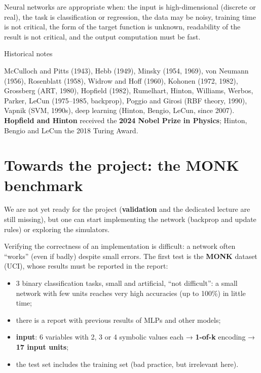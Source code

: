Neural networks are appropriate when: the input is high-dimensional
(discrete or real), the task is classification or regression, the data
may be noisy, training time is not critical, the form of the target
function is unknown, readability of the result is not critical, and the
output computation must be fast.

\begin{boxnote}{Historical notes}

McCulloch and Pitts (1943), Hebb (1949), Minsky (1954, 1969), von
Neumann (1956), Rosenblatt (1958), Widrow and Hoff (1960), Kohonen
(1972, 1982), Grossberg (ART, 1980), Hopfield (1982), Rumelhart,
Hinton, Williams, Werbos, Parker, LeCun (1975--1985, backprop), Poggio
and Girosi (RBF theory, 1990), Vapnik (SVM, 1990s), deep learning
(Hinton, Bengio, LeCun, since 2007). \textbf{Hopfield and Hinton}
received the \textbf{2024 Nobel Prize in Physics}; Hinton, Bengio and
LeCun the 2018 Turing Award.

\end{boxnote}

\section{Towards the project: the MONK
benchmark}\label{verso-il-progetto-il-benchmark-monk}

We are not yet ready for the project (\textbf{validation} and the
dedicated lecture are still missing), but one can start implementing
the network (backprop and update rules) or exploring the simulators.

Verifying the correctness of an implementation is difficult: a network
often ``works'' (even if badly) despite small errors. The first test is
the \textbf{MONK} dataset (UCI), whose results must be reported in the
report:

\begin{itemize}
\tightlist
\item
  3 binary classification tasks, small and artificial, ``not
  difficult'': a small network with few units reaches very high
  accuracies (up to 100\%) in little time;
\item
  there is a report with previous results of MLPs and other models;
\item
  \textbf{input}: 6 variables with 2, 3 or 4 symbolic values each →
  \textbf{1-of-k} encoding → \textbf{17 input units};
\item
  the test set includes the training set (bad practice, but irrelevant
  here).
\end{itemize}

